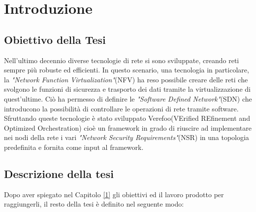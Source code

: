 

\hypersetup{
    colorlinks=true,
    linkcolor=blue
}

\chapter{Introduzione} \label{ch:intro}

\section{Obiettivo della Tesi} 

Nell'ultimo decennio diverse tecnologie di rete si sono sviluppate,
creando reti sempre più robuste ed efficienti. In questo scenario,
una tecnologia in particolare, la \textit{"Network Function Virtualization"}(NFV)
ha reso possibile creare delle reti che svolgono le funzioni di sicurezza e
trasporto dei dati tramite la virtualizzazione di quest'ultime. Ciò ha permesso di definire
le \textit{"Software Defined Network"}(SDN) che introducono la possibilità di controllare le operazioni di rete
 tramite software.\\
Sfruttando queste tecnologie è stato sviluppato Verefoo(VErified REfinement and Optimized Orchestration) cioè 
un framework in grado di riuscire ad implementare nei nodi della rete i vari \textit{"Network Security Requirements"}(NSR) in una topologia predefinita e fornita
come input al framework.\\

\section{Descrizione della tesi}

Dopo aver spiegato nel Capitolo \hyperref[ch:intro]{[1]} gli obiettivi ed il lavoro prodotto per raggiungerli, il resto della
tesi è definito nel seguente modo:

